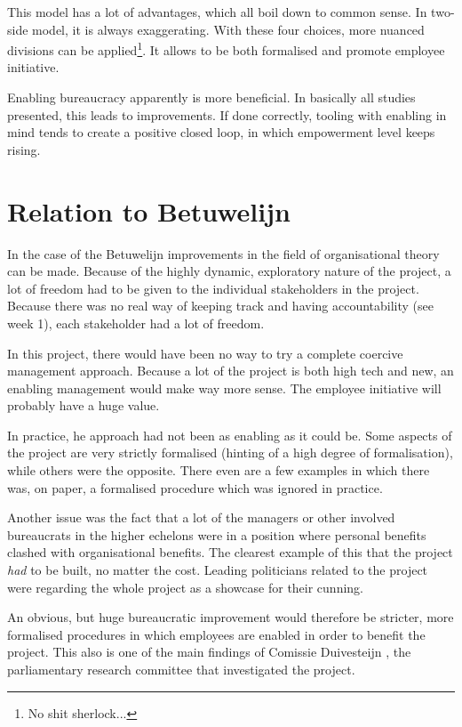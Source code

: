 \documentclass[]{uva-bachelor-thesis}
\begin{document}
This model has a lot of advantages, which all boil down to common sense. 
In two-side model, it is always exaggerating. 
With these four choices, more nuanced divisions can be applied\footnote{No shit sherlock...}. 
It allows to be both formalised and promote employee initiative. 

Enabling bureaucracy apparently is more beneficial. 
In basically all studies presented, this leads to improvements. 
If done correctly, tooling with enabling in mind tends to create a positive closed loop, in which empowerment level keeps rising. 

\section{Relation to Betuwelijn}
In the case of the Betuwelijn improvements in the field of organisational theory can be made. 
Because of the highly dynamic, exploratory nature of the project, a lot of freedom had to be given to the individual stakeholders in the project.
Because there was no real way of keeping track and having accountability (see week 1), each stakeholder had a lot of freedom.

In this project, there would have been no way to try a complete coercive management approach.
Because a lot of the project is both high tech and new, an enabling management would make way more sense.
The employee initiative will probably have a huge value. 

In practice, he approach had not been as enabling as it could be. 
Some aspects of the project are very strictly formalised (hinting of a high degree of formalisation), while others were the opposite. 
There even are a few examples in which there was, on paper, a formalised procedure which was ignored in practice. 

Another issue was the fact that a lot of the managers or other involved bureaucrats in the higher echelons were in a position where personal benefits clashed with organisational benefits. 
The clearest example of this that the project \emph{had} to be built, no matter the cost. 
Leading politicians related to the project were regarding the whole project as a showcase for their cunning. 

An obvious, but huge bureaucratic improvement would therefore be stricter, more formalised procedures in which employees are enabled in order to benefit the project.
This also is one of the main findings of Comissie Duivesteijn \cite{commissie-duivesteijn}, the parliamentary research committee that investigated the project.
\end{document}

